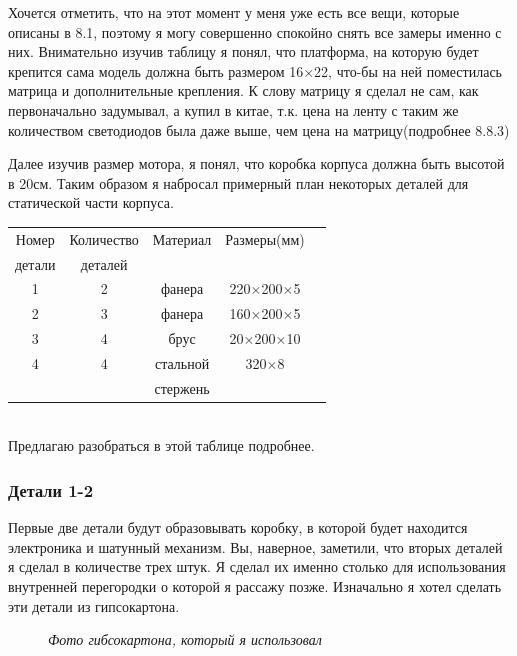 \documentclass[a4paper, 12pt]{article}
\newcommand{\image}[3]{
	\begin{figure}[ht]
		\center{\texttt{[image: img/\#1]} }
		\caption{\textit{#3}}\end{figure}
}
\begin{document}
Хочется отметить, что на этот момент у меня уже есть все вещи, которые описаны
в 8.1, поэтому я могу совершенно спокойно снять все замеры именно с них.
Внимательно изучив таблицу я понял, что платформа, на которую будет крепится
сама модель должна быть размером 16$\times$22, что-бы на ней поместилась
матрица и дополнительные крепления. К слову матрицу я сделал не сам, как
первоначально задумывал, а купил в китае, т.к. цена на ленту с таким же
количеством светодиодов была даже выше, чем цена на матрицу(подробнее 8.8.3)

Далее изучив размер мотора, я понял, что коробка корпуса должна быть высотой в
20см. Таким образом я набросал примерный план некоторых деталей для статической
части корпуса.
\\
\begin{center}
	\begin{tabular}{ |c|c|c|c|c|}
		\hline
		Номер  & Количество & Материал & Размеры(мм)             \\
		детали & деталей    &          &                         \\
		\hline
		1      & 2          & фанера   & 220$\times$200$\times$5 \\
		\hline
		2      & 3          & фанера   & 160$\times$200$\times$5 \\
		\hline
		3      & 4          & брус     & 20$\times$200$\times$10 \\
		\hline
		4      & 4          & стальной & 320$\times$8            \\
		       &            & стержень &                         \\
		\hline
	\end{tabular}
\end{center}
\ \\
Предлагаю разобраться в этой таблице подробнее.\\
\subsubsection{Детали 1-2}

Первые две детали будут образовывать коробку, в которой будет находится
электроника и шатунный механизм. Вы, наверное, заметили, что вторых деталей
я сделал в количестве трех штук. Я сделал их именно столько для использования
внутренней перегородки о которой я рассажу позже. Изначально я хотел сделать
эти детали из гипсокартона.

\image{гибсокартон.jpg}{230}{Фото гибсокартона, который я использовал}
\end{document}
